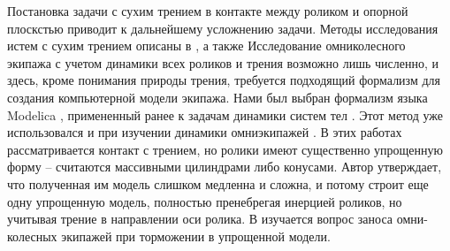 Постановка задачи с сухим трением в контакте между роликом и опорной плоскстью приводит к дальнейшему усложнению задачи. Методы исследования истем с сухим трением описаны в \cite{PfeifferGlocker1993,Pfeiffer1996,Anitescu1997,Lacoursiere2011,Charles2014,Paoli2015,Moreau1988}, а также \cite{Novozhilov1991} Исследование омниколесного экипажа с учетом динамики всех роликов и трения возможно лишь численно, и здесь, кроме понимания природы трения, требуется подходящий формализм для создания компьютерной модели экипажа. Нами был выбран формализм языка Modelica \cite{ModelicaSpec,Dymola,Fritzson}, примененный ранее к задачам динамики систем тел \cite{KosenkoQuaternionRus,Kosenko2006unilat,Kosenko2006,Kosenko2007,KosenkoGraphs2009,KosenkoGusev2012,KosenkoRolling,Kosenko2006,KosenkoAlexandrov,KosenkoKuznetzova}. Этот метод уже использовался и при изучении динамики омниэкипажей \cite{Kalman2012assistant,Kalman2013control,Kalman2013braking,Kalman2013practical}. В этих работах рассматривается контакт с трением, но ролики имеют существенно упрощенную форму -- считаются массивными цилиндрами либо конусами. Автор утверждает, что полученная им модель слишком медленна и сложна, и потому строит еще одну упрощенную модель, полностью пренебрегая инерцией роликов, но учитывая  трение в направлении оси ролика. В \cite{Kalman2013braking} изучается вопрос заноса омни-колесных экипажей при торможении в упрощенной модели.


